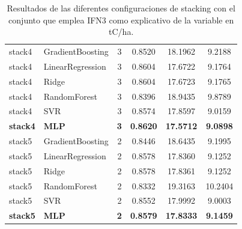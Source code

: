 \begin{table}
\begin{tabular}{llcccc}
        stack4 & GradientBoosting & 3 & 0.8520 & 18.1962 & 9.2188 \\
        stack4 & LinearRegression & 3 & 0.8604 & 17.6722 & 9.1764 \\
        stack4 & Ridge            & 3 & 0.8604 & 17.6723 & 9.1765 \\
        stack4 & RandomForest     & 3 & 0.8396 & 18.9435 & 9.8789 \\
        stack4 & SVR              & 3 & 0.8574 & 17.8597 & 9.0159 \\
        \textbf{stack4} & \textbf{MLP} & \textbf{3} & \textbf{0.8620} & \textbf{17.5712} & \textbf{9.0898} \\
        \hline
        stack5 & GradientBoosting & 2 & 0.8446 & 18.6435 & 9.1995 \\
        stack5 & LinearRegression & 2 & 0.8578 & 17.8360 & 9.1252 \\
        stack5 & Ridge            & 2 & 0.8578 & 17.8361 & 9.1252 \\
        stack5 & RandomForest     & 2 & 0.8332 & 19.3163 & 10.2404 \\
        stack5 & SVR              & 2 & 0.8552 & 17.9992 & 9.0003 \\
        \textbf{stack5} & \textbf{MLP} & \textbf{2} & \textbf{0.8579} & \textbf{17.8333} & \textbf{9.1459} \\
        \hline
    \end{tabular}
    \caption{Resultados de las diferentes configuraciones de stacking con el conjunto que emplea IFN3 como explicativo de la variable en tC/ha.}
    \label{tab:stack_ifn3_tc_ha}
\end{table}

